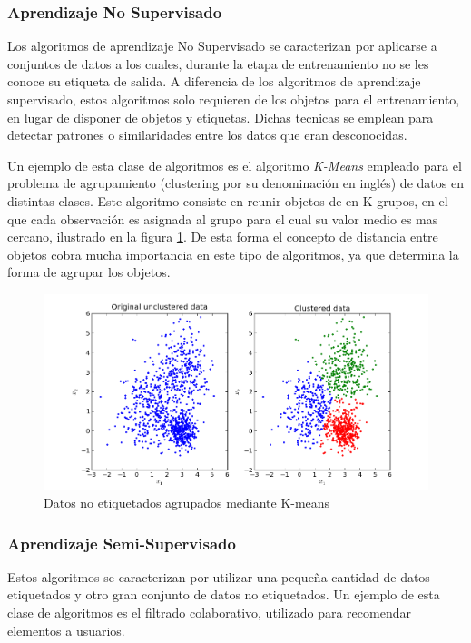 \documentclass[a4paper,11pt,spanish]{book}
\begin{document}
      \subsubsection{Aprendizaje No Supervisado}
	  Los algoritmos de aprendizaje No Supervisado se caracterizan por aplicarse a conjuntos de datos a los cuales, durante la etapa de entrenamiento no se les conoce 
	  su etiqueta de salida. 
	  A diferencia de los algoritmos de aprendizaje supervisado, estos algoritmos solo requieren de los objetos para el entrenamiento, en lugar de disponer
	  de objetos y etiquetas. Dichas tecnicas se emplean para detectar patrones o similaridades entre los datos que eran desconocidas.

	  Un ejemplo de esta clase de algoritmos es el algoritmo \emph{K-Means} empleado para el problema de agrupamiento (clustering por su denominación en inglés) de datos 
	  en distintas clases.
	  Este algoritmo consiste en reunir objetos de en K grupos, en el que cada observación es asignada al grupo para el cual su valor medio es mas cercano, 
	  ilustrado en la figura \ref{fig:clustering}.
	  De esta forma el concepto de distancia entre objetos cobra mucha importancia en este tipo de algoritmos, ya que determina la forma de agrupar los objetos.

	  \begin{figure}[H]
	    \includegraphics[scale=0.5]{./img/stackoverflow_clustering.png}
	    \caption{Datos no etiquetados agrupados mediante K-means}
	    \label{fig:clustering}
	  \end{figure}

      \subsubsection{Aprendizaje Semi-Supervisado}
	Estos algoritmos se caracterizan por utilizar una pequeña cantidad de datos etiquetados y otro gran conjunto de datos no etiquetados. 
	Un ejemplo de esta clase de algoritmos es el filtrado colaborativo, utilizado para recomendar elementos a usuarios.
\end{document}
